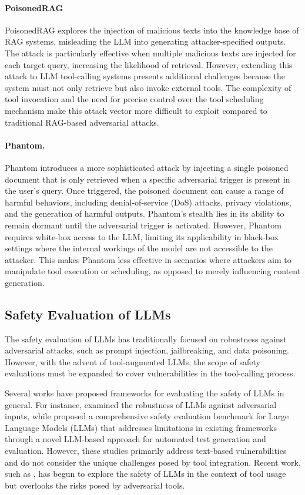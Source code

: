 \paragraph{PoisonedRAG}
PoisonedRAG \cite{zou2024poisonedrag} explores the injection of malicious texts into the knowledge base of RAG systems, misleading the LLM into generating attacker-specified outputs. The attack is particularly effective when multiple malicious texts are injected for each target query, increasing the likelihood of retrieval. However, extending this attack to LLM tool-calling systems presents additional challenges because the system must not only retrieve but also invoke external tools. The complexity of tool invocation and the need for precise control over the tool scheduling mechanism make this attack vector more difficult to exploit compared to traditional RAG-based adversarial attacks.

\paragraph{Phantom.}
Phantom \cite{chaudhari2024phantom} introduces a more sophisticated attack by injecting a single poisoned document that is only retrieved when a specific adversarial trigger is present in the user's query. Once triggered, the poisoned document can cause a range of harmful behaviors, including denial-of-service (DoS) attacks, privacy violations, and the generation of harmful outputs. Phantom's stealth lies in its ability to remain dormant until the adversarial trigger is activated. However, Phantom requires white-box access to the LLM, limiting its applicability in black-box settings where the internal workings of the model are not accessible to the attacker. This makes Phantom less effective in scenarios where attackers aim to manipulate tool execution or scheduling, as opposed to merely influencing content generation.

\subsection{Safety Evaluation of LLMs}
The safety evaluation of LLMs has traditionally focused on robustness against adversarial attacks, such as prompt injection, jailbreaking, and data poisoning. However, with the advent of tool-augmented LLMs, the scope of safety evaluations must be expanded to cover vulnerabilities in the tool-calling process. 

Several works have proposed frameworks for evaluating the safety of LLMs in general. For instance, \cite{yu2024reeval} examined the robustness of LLMs against adversarial inputs, while \cite{yuan2024s} proposed a comprehensive safety evaluation benchmark for Large Language Models (LLMs) that addresses limitations in existing frameworks through a novel LLM-based approach for automated test generation and evaluation. However, these studies primarily address text-based vulnerabilities and do not consider the unique challenges posed by tool integration. Recent work, such as \cite{ye2024toolsword}, has begun to explore the safety of LLMs in the context of tool usage but overlooks the risks posed by adversarial tools.

